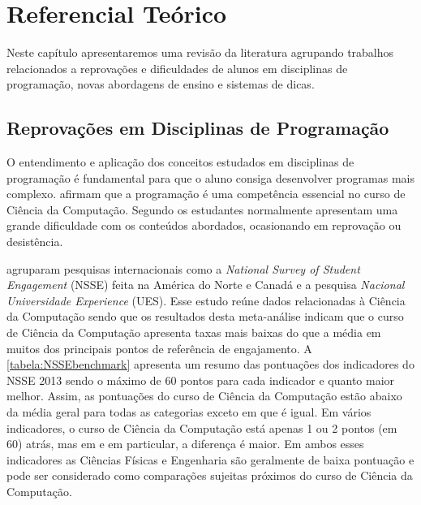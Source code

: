 \chapter{Referencial Teórico}

Neste capítulo apresentaremos uma revisão da literatura agrupando trabalhos relacionados a reprovações e dificuldades de alunos em disciplinas de programação, novas abordagens de ensino e sistemas de dicas. 

\section{Reprovações em Disciplinas de Programação}

O entendimento e aplicação dos conceitos estudados em disciplinas de programação é fundamental para que o aluno consiga desenvolver programas mais complexo.  afirmam que a programação é uma competência essencial no curso de Ciência da Computação. Segundo  os estudantes normalmente apresentam uma grande dificuldade com os conteúdos abordados, ocasionando em reprovação ou desistência.

 agruparam pesquisas internacionais como a \textit{National Survey of Student Engagement} (NSSE) feita na América do Norte e Canadá e a pesquisa \textit{Nacional Universidade Experience} (UES). Esse estudo reúne dados relacionadas à Ciência da Computação sendo que os resultados desta meta-análise indicam que o curso de Ciência da Computação apresenta taxas mais baixas do que a média em muitos dos principais pontos de referência de engajamento. A \cref{tabela:NSSEbenchmark} apresenta um resumo das pontuações dos indicadores do NSSE 2013 sendo o máximo de 60 pontos para cada indicador e quanto maior melhor. Assim, as pontuações do curso de Ciência da Computação estão abaixo da média geral para todas as categorias exceto  em que é igual. Em vários indicadores, o curso de Ciência da Computação está apenas 1 ou 2 pontos (em 60) atrás, mas em  e  em particular, a diferença é maior. Em ambos esses indicadores as Ciências Físicas e Engenharia são geralmente de baixa pontuação e pode ser considerado como comparações sujeitas próximos do curso de Ciência da Computação. 

